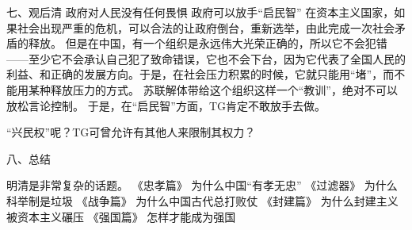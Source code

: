 七、观后清
政府对人民没有任何畏惧
政府可以放手“启民智”
在资本主义国家，如果社会出现严重的危机，可以合法的让政府倒台，重新选举，由此完成一次社会矛盾的释放。
但是在中国，有一个组织是永远伟大光荣正确的，所以它不会犯错——至少它不会承认自己犯了致命错误，它也不会下台，因为它代表了全国人民的利益、和正确的发展方向。于是，在社会压力积累的时候，它就只能用“堵”，而不能用某种释放压力的方式。
苏联解体带给这个组织这样一个“教训”，绝对不可以放松言论控制。
于是，在“启民智”方面，TG肯定不敢放手去做。

“兴民权”呢？TG可曾允许有其他人来限制其权力？

八、总结

明清是非常复杂的话题。
《忠孝篇》 为什么中国“有孝无忠”
《过滤器》 为什么科举制是垃圾
《战争篇》 为什么中国古代总打败仗
《封建篇》 为什么封建主义被资本主义碾压
《强国篇》 怎样才能成为强国


